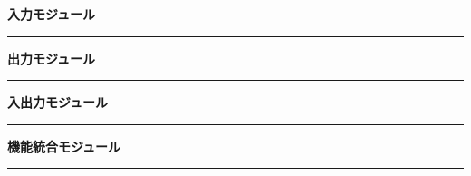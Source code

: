 \bigskip
\noindent\textcolor{headerblue}{\textbf{\Large 入力モジュール}}
\vspace{-0.3em}

\noindent\textcolor{accentblue}{\rule{\textwidth}{1.0pt}}
\medskip







\bigskip
\noindent\textcolor{headerblue}{\textbf{\Large 出力モジュール}}
\vspace{-0.3em}

\noindent\textcolor{accentblue}{\rule{\textwidth}{1.0pt}}
\medskip






\bigskip
\noindent\textcolor{headerblue}{\textbf{\Large 入出力モジュール}}
\vspace{-0.3em}

\noindent\textcolor{accentblue}{\rule{\textwidth}{1.0pt}}
\medskip





\bigskip
\noindent\textcolor{headerblue}{\textbf{\Large 機能統合モジュール}}
\vspace{-0.3em}

\noindent\textcolor{accentblue}{\rule{\textwidth}{1.0pt}}
\medskip


